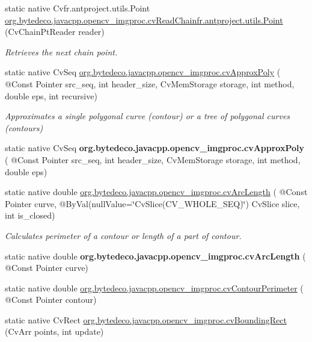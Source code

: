 \begin{DoxyCompactItemize}
static native Cv\+fr.antproject.utils.Point \hyperlink{group__imgproc__c_ga60ca24d0d962737958150406351d91c7}{org.\+bytedeco.\+javacpp.\+opencv\+\_\+imgproc.\+cv\+Read\+Chain\+fr.antproject.utils.Point} (Cv\+Chain\+Pt\+Reader reader)
\begin{DoxyCompactList}\small\item\em Retrieves the next chain point. \end{DoxyCompactList}\item 
static native Cv\+Seq \hyperlink{group__imgproc__c_ga04330d92548cde6503b33785252af580}{org.\+bytedeco.\+javacpp.\+opencv\+\_\+imgproc.\+cv\+Approx\+Poly} ( @Const Pointer src\+\_\+seq, int header\+\_\+size, Cv\+Mem\+Storage storage, int method, double eps, int recursive)
\begin{DoxyCompactList}\small\item\em Approximates a single polygonal curve (contour) or a tree of polygonal curves (contours) \end{DoxyCompactList}\item 
\mbox{\label{group__imgproc__c_ga1775ce0cb25cf8dd0960bdb260fb3c10}} 
static native Cv\+Seq {\bfseries org.\+bytedeco.\+javacpp.\+opencv\+\_\+imgproc.\+cv\+Approx\+Poly} ( @Const Pointer src\+\_\+seq, int header\+\_\+size, Cv\+Mem\+Storage storage, int method, double eps)
\item 
static native double \hyperlink{group__imgproc__c_gaf095420cca062536116edaad5f0391ae}{org.\+bytedeco.\+javacpp.\+opencv\+\_\+imgproc.\+cv\+Arc\+Length} ( @Const Pointer curve, @By\+Val(null\+Value=\char`\"{}Cv\+Slice(C\+V\+\_\+\+W\+H\+O\+L\+E\+\_\+\+S\+EQ)\char`\"{}) Cv\+Slice slice, int is\+\_\+closed)
\begin{DoxyCompactList}\small\item\em Calculates perimeter of a contour or length of a part of contour. \end{DoxyCompactList}\item 
\mbox{\label{group__imgproc__c_ga75289cca5f4a047ccbd0bcdb8e1a6fe3}} 
static native double {\bfseries org.\+bytedeco.\+javacpp.\+opencv\+\_\+imgproc.\+cv\+Arc\+Length} ( @Const Pointer curve)
\item 
static native double \hyperlink{group__imgproc__c_ga420bd05e2f839e52bdb1db41cea427af}{org.\+bytedeco.\+javacpp.\+opencv\+\_\+imgproc.\+cv\+Contour\+Perimeter} ( @Const Pointer contour)
\item 
static native Cv\+Rect \hyperlink{group__imgproc__c_ga83c0146f56d5c70d0eb462023220933e}{org.\+bytedeco.\+javacpp.\+opencv\+\_\+imgproc.\+cv\+Bounding\+Rect} (Cv\+Arr points, int update)

\end{DoxyCompactItemize}
